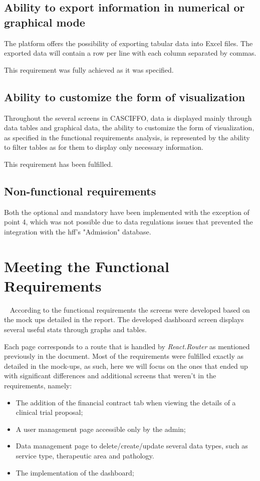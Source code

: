 \subsection{Ability to export information in numerical or graphical mode}
The platform offers the possibility of exporting tabular data into Excel files. The exported data will contain a row per line with each column separated by commas.

This requirement was fully achieved as it was specified.


\subsection{Ability to customize the form of visualization}

Throughout the several screens in CASCIFFO, data is displayed mainly through data tables and graphical data, the ability to customize the form of visualization, as specified in the functional requirements analysis, is represented by the ability to filter tables as for them to display only necessary information.

This requirement has been fulfilled.


\subsection{Non-functional requirements}

Both the optional and mandatory have been implemented with the exception of point 4, which was not possible due to data regulations issues that prevented the integration with the \acrshort{hff}'s "Admission" database.


\section{Meeting the Functional Requirements}~\label{ch:eval:sec:meeting-reqs}
According to the functional requirements the screens were developed based on the mock ups detailed in the report.  The developed dashboard screen displays several useful stats through graphs and tables.

Each page corresponds to a route that is handled by \textit{React.Router} as mentioned previously in the document.
Most of the requirements were fulfilled exactly as detailed in the mock-ups, as such, here we will focus on the ones that ended up with significant differences and additional screens that weren't in the requirements, namely:

\begin{itemize}
    \item The addition of the financial contract tab when viewing the details of a clinical trial proposal;
    \item A user management page accessible only by the admin;
    \item Data management page to delete/create/update several data types, such as service type, therapeutic area and pathology.
    \item The implementation of the dashboard;
\end{itemize}

